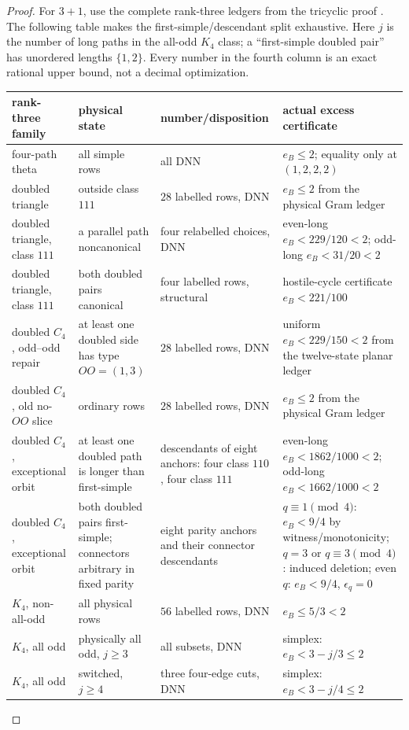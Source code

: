 \documentclass[11pt]{article}
\theoremstyle{remark}
\begin{document}
\begin{proof}
For $3+1$, use the complete rank-three ledgers from the tricyclic proof
\cite{TricyclicGraphs}.  The following table makes the first-simple/descendant
split exhaustive.  Here $j$ is the number of long paths in the all-odd
$K_4$ class; a ``first-simple doubled pair'' has unordered lengths
$\{1,2\}$.  Every number in the fourth column is an exact rational upper
bound, not a decimal optimization.
\begin{center}
\small
\begin{tabular}{p{2.4cm}p{3.3cm}p{3.0cm}p{3.2cm}}
\toprule
rank-three family&physical state&number/disposition&actual excess certificate\\
\midrule
four-path theta&all simple rows&all DNN&$e_B\leq2$; equality only at $(1,2,2,2)$\\
doubled triangle&outside class $111$&$28$ labelled rows, DNN&$e_B\leq2$ from the physical Gram ledger\\
doubled triangle, class $111$&a parallel path noncanonical&four relabelled choices, DNN&even-long $e_B<229/120<2$; odd-long $e_B<31/20<2$\\
doubled triangle, class $111$&both doubled pairs canonical&four labelled rows, structural&hostile-cycle certificate $e_B<221/100$\\
doubled $C_4$, odd--odd repair&at least one doubled side has type $OO=(1,3)$&$28$ labelled rows, DNN&uniform $e_B<229/150<2$ from the twelve-state planar ledger\\
doubled $C_4$, old no-$OO$ slice&ordinary rows&$28$ labelled rows, DNN&$e_B\leq2$ from the physical Gram ledger\\
doubled $C_4$, exceptional orbit&at least one doubled path is longer than first-simple&descendants of eight anchors: four class $110$, four class $111$&even-long $e_B<1862/1000<2$; odd-long $e_B<1662/1000<2$\\
doubled $C_4$, exceptional orbit&both doubled pairs first-simple; connectors arbitrary in fixed parity&eight parity anchors and their connector descendants&$q\equiv1\pmod4$: $e_B<9/4$ by witness/monotonicity; $q=3$ or $q\equiv3\pmod4$: induced deletion; even $q$: $e_B<9/4$, $\epsilon_q=0$\\
$K_4$, non-all-odd&all physical rows&$56$ labelled rows, DNN&$e_B\leq5/3<2$\\
$K_4$, all odd&physically all odd, $j\geq3$&all subsets, DNN&simplex: $e_B<3-j/3\leq2$\\
$K_4$, all odd&switched, $j\geq4$&three four-edge cuts, DNN&simplex: $e_B<3-j/4\leq2$\\

\end{tabular}
\end{center}
\end{proof}
\end{document}
